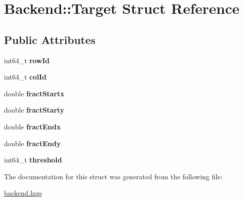 \hypertarget{struct_backend_1_1_target}{}\section{Backend\+:\+:Target Struct Reference}
\label{struct_backend_1_1_target}
\subsection*{Public Attributes}
\begin{DoxyCompactItemize}
\item 
\mbox{\label{struct_backend_1_1_target_abc5769a0e3767b669ea2ebc2a1f44442}} 
int64\+\_\+t {\bfseries row\+Id}
\item 
\mbox{\label{struct_backend_1_1_target_ae3a088cdb0797abe93f9d1eb86d6f931}} 
int64\+\_\+t {\bfseries col\+Id}
\item 
\mbox{\label{struct_backend_1_1_target_a1b78d2d7e0b75a746a0e1f47801c7a7f}} 
double {\bfseries fract\+Startx}
\item 
\mbox{\label{struct_backend_1_1_target_af49bb2d818bcb20a477de686bdb74419}} 
double {\bfseries fract\+Starty}
\item 
\mbox{\label{struct_backend_1_1_target_a6b0b97b4fc4330424216bbebb3a0ff4d}} 
double {\bfseries fract\+Endx}
\item 
\mbox{\label{struct_backend_1_1_target_a43e1aef351c77d64ea0041e170ab8100}} 
double {\bfseries fract\+Endy}
\item 
\mbox{\label{struct_backend_1_1_target_a94d950bf95b964f38685990674cb9d6c}} 
int64\+\_\+t {\bfseries threshold}
\end{DoxyCompactItemize}


The documentation for this struct was generated from the following file\+:\begin{DoxyCompactItemize}
\item 
\hyperlink{backend_8hpp}{backend.\+hpp}\end{DoxyCompactItemize}
